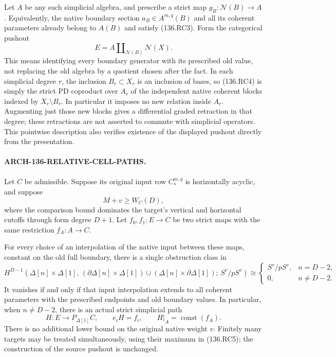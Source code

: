 Let \(A\) be any such simplicial algebra, and prescribe a strict
map \(g_B:\mathcal N(B)\to A\). Equivalently, the native
boundary section \(a_B\in A^{m,q}(B)\) and all its coherent
parameters already belong to \(A(B)\) and satisfy (136.RC3).
Form the categorical pushout
\[
                E=A\amalg_{\mathcal N(B)}\mathcal N(X).
                                                               \tag{136.RC4}
\]
This means identifying every boundary generator with its prescribed
old value, not replacing the old algebra by a quotient chosen after
the fact. In each simplicial degree \(r\), the inclusion
\(B_r\subset X_r\) is an inclusion of bases, so (136.RC4)
is simply the strict PD coproduct over \(A_r\) of the independent
native coherent blocks indexed by \(X_r\setminus B_r\).
In particular it imposes no new relation inside \(A_r\).
Augmenting just those new blocks gives a differential graded
retraction in that degree; these retractions are not asserted to
commute with simplicial operators. This pointwise description
also verifies existence of the displayed pushout directly from
the presentation.

\paragraph{ARCH-136-RELATIVE-CELL-PATHS.}
Let \(C\) be admissible. Suppose its original input row
\(C_*^{m,q}\) is horizontally acyclic, and suppose
\[
                         M+v\geq W_C(D),                 \tag{136.RC5}
\]
where the comparison bound dominates the target's vertical and
horizontal cutoffs through form degree \(D+1\). Let
\(f_0,f_1:E\to C\) be two strict maps with the same
restriction \(f_A:A\to C\).

For every choice of an interpolation of the native input between
these maps, constant on the old full boundary, there is a single
obstruction class in
\[
 H^{D-1}\!\left(\Delta[n]\times\Delta[1],\,
  (\partial\Delta[n]\times\Delta[1])\cup
  (\Delta[n]\times\partial\Delta[1]);\,S^v/pS^v\right)
 \cong
 \begin{cases}
 S^v/pS^v,&n=D-2,\\
 0,&n\ne D-2.
 \end{cases}                                               \tag{136.RC6}
\]
It vanishes if and only if that input interpolation extends to
all coherent parameters with the prescribed endpoints and old
boundary values. In particular, when \(n\ne D-2\), there is
an actual strict simplicial path
\[
               H:E\longrightarrow P_{\Delta[1]}C,
       \qquad e_iH=f_i,\qquad
               H|_A=\operatorname{const}(f_A).             \tag{136.RC7}
\]
There is no additional lower bound on the original native weight
\(v\). Finitely many targets may be treated simultaneously,
using their maximum in (136.RC5); the construction of the source
pushout is unchanged.

